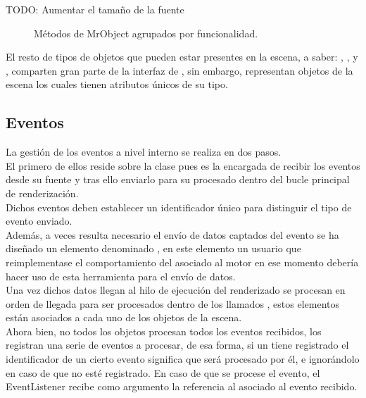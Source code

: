 TODO: Aumentar el tamaño de la fuente
\begin{figure}[h!]
\centering
{}
\hspace{0mm}
\caption[Métodos de MrObject]{Métodos de MrObject agrupados por funcionalidad.}
\label{fig:metodosmrobject}
\end{figure}

El resto de tipos de objetos que pueden estar presentes en la escena, a saber: \rorefmodel, \rorefcamera, \roreflight y \rorefscene, comparten gran parte de la interfaz de \rorefobject, sin embargo, representan objetos de la escena los cuales tienen atributos únicos de su tipo.\\ 

\subsection{Eventos}

La gestión de los eventos a nivel interno se realiza en dos pasos.\\
El primero de ellos reside sobre la clase \rorefeventdispatcher pues es la encargada de recibir los eventos desde su fuente y tras ello enviarlo para su procesado dentro del bucle principal de renderización.\\
Dichos eventos deben establecer un identificador único para distinguir el tipo de evento enviado.\\
Además, a veces resulta necesario el envío de datos captados del evento se ha diseñado un elemento denominado \rorefbundle, en este elemento un usuario que reimplementase el comportamiento del \rorefeventdispatcher asociado al motor en ese momento debería hacer uso de esta herramienta para el envío de datos.\\

Una vez dichos datos llegan al hilo de ejecución del renderizado se procesan en orden de llegada para ser procesados dentro de los llamados \rorefeventlistener, estos elementos están asociados a cada uno de los objetos de la escena.\\
Ahora bien, no todos los objetos procesan todos los eventos recibidos, los \rorefeventlistener registran una serie de eventos a procesar, de esa forma, si un \rorefeventlistener tiene registrado el identificador de un cierto evento significa que será procesado por él, e ignorándolo en caso de que no esté registrado. En caso de que se procese el evento, el EventListener recibe como argumento la referencia al \rorefbundle asociado al evento recibido.

